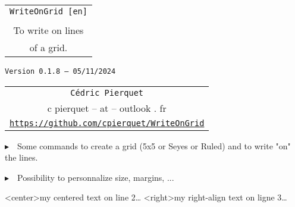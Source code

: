 \documentclass[a4paper]{article}
\def\TPversion{0.1.8}
\def\TPdate{05/11/2024}
\begin{document}
\pagestyle{fancy}

\thispagestyle{empty}

\vspace{2cm}

\begin{center}
	\begin{minipage}{0.75\linewidth}
	\begin{tcolorbox}[colframe=yellow,colback=yellow!15]
		\begin{center}
			\begin{tabular}{c}
				{\Huge \texttt{WriteOnGrid [en]}}\\
				\\
				{\LARGE To write on lines} \\
				{\LARGE of a grid.}
			\end{tabular}
			
			\medskip
			
			{\small \texttt{Version \TPversion{} -- \TPdate}}
		\end{center}
	\end{tcolorbox}
\end{minipage}
\end{center}

\vspace{0.5cm}

\begin{center}
	\begin{tabular}{c}
	\texttt{Cédric Pierquet}\\
	{\ttfamily c pierquet -- at -- outlook . fr}\\
	\texttt{\url{https://github.com/cpierquet/WriteOnGrid}}
\end{tabular}
\end{center}

\vspace{0.5cm}

{$\blacktriangleright$~~Some commands to create a grid (5x5 or Seyes or Ruled) and to write "on" the lines.}

\smallskip

{$\blacktriangleright$~~Possibility to personnalize size, margins, ...}

\vspace{1cm}

\begin{center}
	\begin{EnvGrid}[NumSquares=22x8]
	\WriteLine<center>{my centered text on line 2\ldots}
	\WriteLine<right>{my right-align text on ligne 3\ldots}
	\PassLine
\end{EnvGrid}
\end{center}
\end{document}
